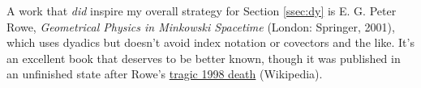 \documentclass[12pt]{article}
\begin{document}
A work that \emph{did} inspire my overall strategy for Section \ref{ssec:dy} is E. G. Peter Rowe, \emph{Geometrical Physics in Minkowski Spacetime} (London: Springer, 2001), which uses dyadics but doesn't avoid index notation or covectors and the like. It's an excellent book that deserves to be better known, though it was published in an unfinished state after Rowe's \href{https://en.wikipedia.org/wiki/December_1998_tourist_kidnappings_in_Yemen}{tragic 1998 death} (Wikipedia).
\end{document}

